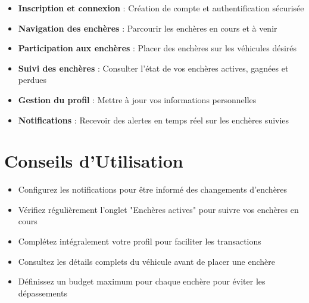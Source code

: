 \begin{itemize}
    \item \textbf{Inscription et connexion} : Création de compte et authentification sécurisée
    \item \textbf{Navigation des enchères} : Parcourir les enchères en cours et à venir
    \item \textbf{Participation aux enchères} : Placer des enchères sur les véhicules désirés
    \item \textbf{Suivi des enchères} : Consulter l'état de vos enchères actives, gagnées et perdues
    \item \textbf{Gestion du profil} : Mettre à jour vos informations personnelles
    \item \textbf{Notifications} : Recevoir des alertes en temps réel sur les enchères suivies
\end{itemize}

\section{Conseils d'Utilisation}

\begin{itemize}
    \item Configurez les notifications pour être informé des changements d'enchères
    \item Vérifiez régulièrement l'onglet "Enchères actives" pour suivre vos enchères en cours
    \item Complétez intégralement votre profil pour faciliter les transactions
    \item Consultez les détails complets du véhicule avant de placer une enchère
    \item Définissez un budget maximum pour chaque enchère pour éviter les dépassements
\end{itemize} 